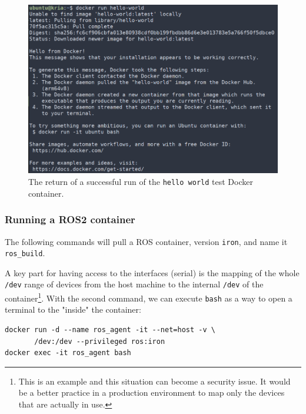 \documentclass[10pt]{article}
\begin{document}
\begin{figure}[htbp]
\centering
\includegraphics[width=.7\textwidth]{./img/hello-docker.png}
\caption{\label{fig:org91c3f38}The return of a successful run of the \texttt{hello world} test Docker container.}
\end{figure}


\subsubsection{Running a ROS2 container}
\label{sec:org504bbab}
The following commands will pull a ROS container, version \texttt{iron}, and name it \texttt{ros\_build}.

A key part for having access to the interfaces (serial) is the mapping of the whole \texttt{/dev}
range of devices from the host machine to the internal \texttt{/dev} of the container\footnote{This is an example and this situation can become a security issue. It would be a better practice
in a production environment to map only the devices that are actually in use.}.
With the second command, we can execute \texttt{bash} as a way to open a terminal to the "inside" the container:
\begin{verbatim}
docker run -d --name ros_agent -it --net=host -v \
       /dev:/dev --privileged ros:iron
docker exec -it ros_agent bash
\end{verbatim}
\end{document}
